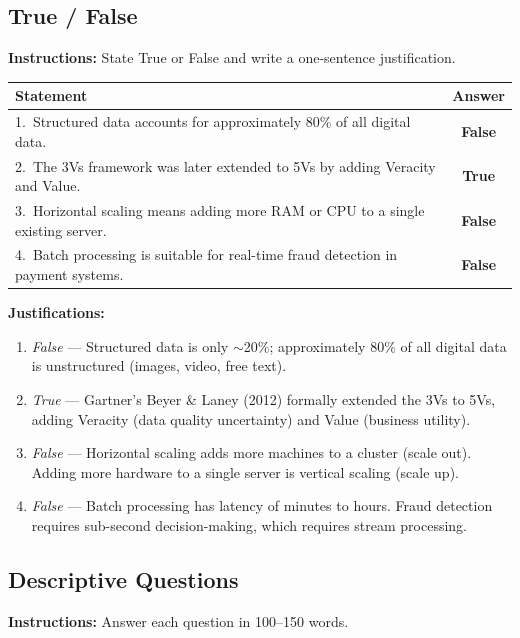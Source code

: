 \documentclass[12pt,a4paper]{article}
\begin{document}
\subsection*{True / False}

\noindent\textbf{Instructions:} State True or False and write a one-sentence justification.

\begin{center}
\renewcommand{\arraystretch}{1.55}
\begin{tabular}{p{9.5cm}c}
  \toprule
  \textbf{Statement} & \textbf{Answer} \\
  \midrule
  1.\ Structured data accounts for approximately 80\% of all digital data. &
  \textbf{\textcolor{PURed}{False}} \\
  2.\ The 3Vs framework was later extended to 5Vs by adding Veracity and Value. &
  \textbf{True} \\
  3.\ Horizontal scaling means adding more RAM or CPU to a single existing server. &
  \textbf{\textcolor{PURed}{False}} \\
  4.\ Batch processing is suitable for real-time fraud detection in payment systems. &
  \textbf{\textcolor{PURed}{False}} \\
  \bottomrule
\end{tabular}
\end{center}

\noindent\textbf{Justifications:}
\begin{enumerate}[leftmargin=2em, nosep, after=\vspace{6pt}]
  \item \textit{False} — Structured data is only $\sim$20\%; approximately 80\% of all digital data is unstructured (images, video, free text).
  \item \textit{True} — Gartner's Beyer \& Laney (2012) formally extended the 3Vs to 5Vs, adding Veracity (data quality uncertainty) and Value (business utility).
  \item \textit{False} — Horizontal scaling adds more machines to a cluster (scale out). Adding more hardware to a single server is vertical scaling (scale up).
  \item \textit{False} — Batch processing has latency of minutes to hours. Fraud detection requires sub-second decision-making, which requires stream processing.
\end{enumerate}

\subsection*{Descriptive Questions}
\noindent\textbf{Instructions:} Answer each question in 100--150 words.
\end{document}
